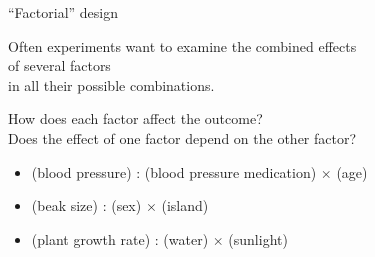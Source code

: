 \begin{frame}{``Factorial'' design}

    Often experiments want to examine the combined effects \\
    of several \alert{factors} \\
    in all their possible combinations. \\

    \vspace{2em}

    How does each factor affect the outcome? \\
    Does the \alert{effect} of one factor depend on the other factor?

    \vspace{2em}


    \begin{itemize}
        \item (blood pressure) :  (blood pressure medication) $\times$ (age)
          \pause
        \item (beak size) : (sex) $\times$ (island)
          \pause
        \item (plant growth rate) : (water) $\times$ (sunlight)
    \end{itemize}


\end{frame}


